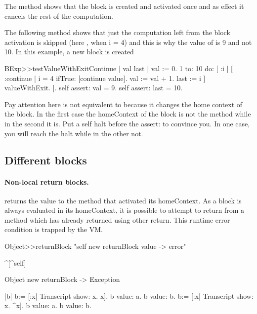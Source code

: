 \documentclass[a4paper,10pt,twoside]{book}
\begin{document}
The method  shows that the block  is created and activated once and as effect it cancels the rest of the computation. 

The following method  shows that just the computation left from the block activation is skipped (here , when i = 4) and this is why the value of  is 9 and not 10. 
In this example, a new block is created 


\begin{code}{}
BExp>>testValueWithExitContinue
	| val last |	
	val := 0. 
	1 to: 10 do: [ :i |
		[ :continue |
			i = 4 ifTrue: [continue value].
			val := val + 1.
			last := i
		] valueWithExit.
	].
	self assert: val = 9.
	self assert: last = 10.	
\end{code}

Pay attention here  is not equivalent to  because it changes the home context of the block. 
In the first case the homeContext of the block is not the method  while in the second it is.
Put a self halt before the assert: to convince you. In one case, you will reach the halt while in the other not. 




\subsection{Different blocks} 


\paragraph{Non-local return blocks.} \ct{[:x :y| x*x. ^ x + y]} returns the value to the method that activated its homeContext. As a block is always evaluated in its homeContext, it is possible to attempt to return from a method which has already returned using other return. This runtime error condition is trapped by the VM.

\begin{code}{}
Object>>returnBlock
	"self new returnBlock value -> error"

	^[^self]

Object new returnBlock
-> Exception
\end{code}	
	
	
\begin{code}{}
|b| 
b:= [:x| Transcript show: x. x].
b value: a. b value: b.
b:= [:x| Transcript show: x. ^x].
b value: a. b value: b.
\end{code}
 
\end{document}
